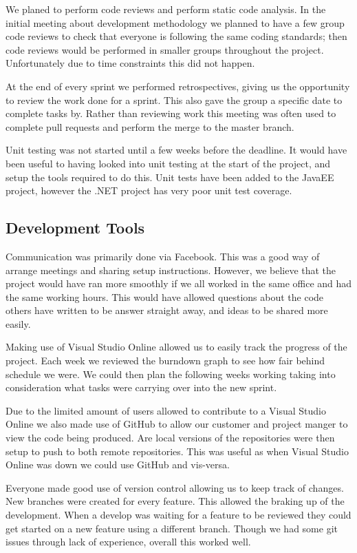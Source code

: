We planed to perform code reviews and perform static code analysis. In the initial meeting about development methodology we planned to have a few group code reviews to check that everyone is following the same coding standards; then code reviews would be performed in smaller groups throughout the project. Unfortunately due to time constraints this did not happen.

At the end of every sprint we performed retrospectives, giving us the opportunity to review the work done for a sprint. This also gave the group a specific date to complete tasks by. Rather than reviewing work this meeting was often used to complete pull requests and perform the merge to the master branch. 

Unit testing was not started until a few weeks before the deadline. It would have been useful to having looked into unit testing at the start of the project, and setup the tools required to do this. Unit tests have been added to the JavaEE project, however the .NET project has very poor unit test coverage. 

\subsection{Development Tools}

Communication was primarily done via Facebook. This was a good way of arrange meetings and sharing setup instructions. However, we believe that the project would have ran more smoothly if we all worked in the same office and had the same working hours. This would have allowed questions about the code others have written to be answer straight away, and ideas to be shared more easily. 

Making use of Visual Studio Online allowed us to easily track the progress of the project. Each week we reviewed the burndown graph to see how fair behind schedule we were. We could then plan the following weeks working taking into consideration what tasks were carrying over into the new sprint. 

Due to the limited amount of users allowed to contribute to a Visual Studio Online we also made use of GitHub to allow our customer and project manger to view the code being produced. Are local versions of the repositories were then setup to push to both remote repositories. This was useful as when Visual Studio Online was down we could use GitHub and vis-versa. 

Everyone made good use of version control allowing us to keep track of changes. New branches were created for every feature. This allowed the braking up of the development. When a develop was waiting for a feature to be reviewed they could get started on a new feature using a different branch. Though we had some git issues through lack of experience, overall this worked well.

